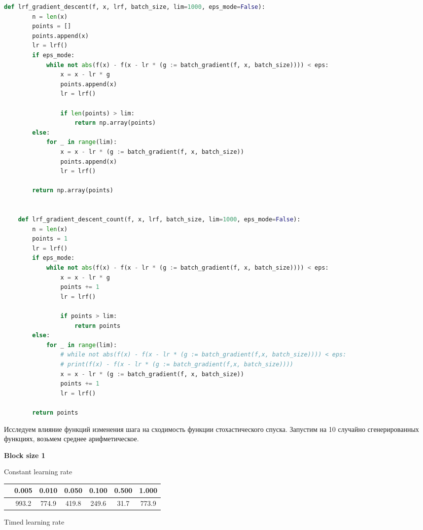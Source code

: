 \documentclass[a4paper,14pt,oneside,openany]{memoir}
\begin{document}
\begin{lstlisting}[language=Python, caption={Реализация функций стохастического градиентного спуска, использующих функции изменения шага}]
	def lrf_gradient_descent(f, x, lrf, batch_size, lim=1000, eps_mode=False):
	    n = len(x)
	    points = []
	    points.append(x)
	    lr = lrf()
	    if eps_mode:
	        while not abs(f(x) - f(x - lr * (g := batch_gradient(f, x, batch_size)))) < eps:
	            x = x - lr * g
	            points.append(x)
	            lr = lrf()
	
	            if len(points) > lim:
	                return np.array(points)
	    else:
	        for _ in range(lim):
	            x = x - lr * (g := batch_gradient(f, x, batch_size))
	            points.append(x)
	            lr = lrf()
	
	    return np.array(points)
	
	
	def lrf_gradient_descent_count(f, x, lrf, batch_size, lim=1000, eps_mode=False):
	    n = len(x)
	    points = 1
	    lr = lrf()
	    if eps_mode:
	        while not abs(f(x) - f(x - lr * (g := batch_gradient(f, x, batch_size)))) < eps:
	            x = x - lr * g
	            points += 1
	            lr = lrf()
	
	            if points > lim:
	                return points
	    else:
	        for _ in range(lim):
	            # while not abs(f(x) - f(x - lr * (g := batch_gradient(f,x, batch_size)))) < eps:
	            # print(f(x) - f(x - lr * (g := batch_gradient(f,x, batch_size))))
	            x = x - lr * (g := batch_gradient(f, x, batch_size))
	            points += 1
	            lr = lrf()
	
	    return points
\end{lstlisting}

Исследуем влияние функций изменения шага на сходимость функции стохастического спуска. Запустим на 10 случайно сгенерированных функциях, возьмем среднее арифметическое.

	\textbf{Block size 1} 
	
	Constant learning rate 
	
	\begin{tabular}{|c|c|c|c|c|c|c|}
	\hline 
	 &0.005 &0.010 &0.050 &0.100 &0.500 &1.000 \\
	 \hline 
	 &993.2 &774.9 &419.8 &249.6 &31.7 &773.9 \\
	 \hline 
	
	\end{tabular}
	
	Timed learning rate 
	
\end{document}
